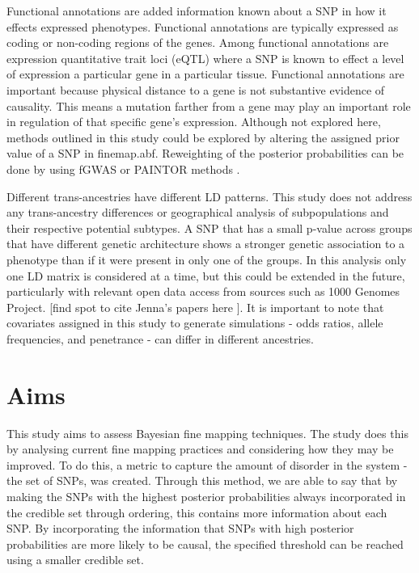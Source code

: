 Functional annotations are added information known about a SNP in how it effects expressed phenotypes. Functional annotations are typically expressed as coding or non-coding regions of the genes. Among functional annotations are expression quantitative trait loci (eQTL) where a SNP is known to effect a level of expression a particular gene in a particular tissue. Functional annotations are important because physical distance to a gene is not substantive evidence of causality. This means a mutation farther from a gene may play an important role in regulation of that specific gene's expression. 
Although not explored here, methods outlined in this study could be explored by altering the assigned prior value of a SNP in finemap.abf. Reweighting of the posterior probabilities can be done by using fGWAS \cite{Pickrell2014} or PAINTOR methods \cite{Kichaev2014}. 

Different trans-ancestries have different LD patterns. This study does not address any trans-ancestry differences or geographical analysis of subpopulations and their respective potential subtypes.  A SNP that has a small p-value across groups that have different genetic architecture shows a stronger genetic association to a phenotype than if it were present in only one of the groups. In this analysis only one LD matrix is considered at a time, but this could be extended in the future, particularly with relevant open data access from sources such as 1000 Genomes Project. [find spot to cite Jenna's papers here ]. It is important to note that covariates assigned in this study to generate simulations - odds ratios, allele frequencies, and penetrance - can differ in different ancestries. 

\section{Aims}
This study aims to assess Bayesian fine mapping techniques. The study does this by analysing current fine mapping practices and considering how they may be improved. To do this, a metric to capture the amount of disorder in the system - the set of SNPs, was created. Through this method, we are able to say that by making the SNPs with the highest posterior probabilities always incorporated in the credible set through ordering, this contains more information about each SNP. By incorporating the information that SNPs with high posterior probabilities are more likely to be causal, the specified threshold can be reached using a smaller credible set.


